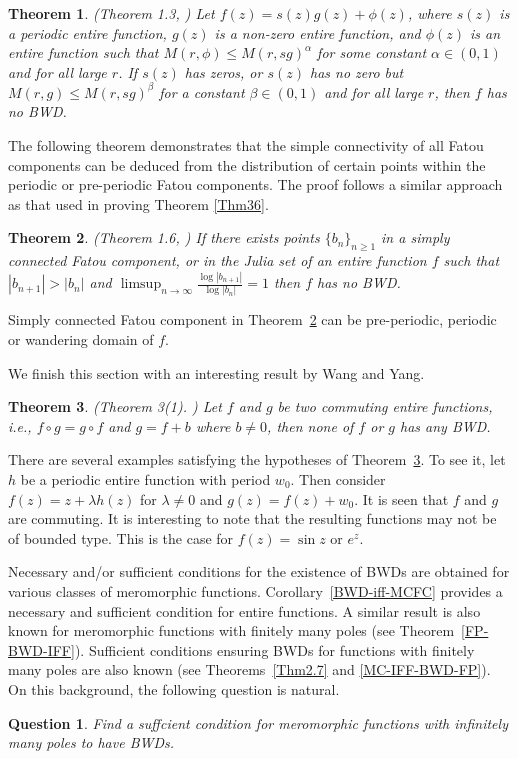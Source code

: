 \documentclass[11pt,a4paper]{article}
\newtheorem{theorem}{Theorem}[section]
\newtheorem{Question}{Question}
\begin{document}
	\begin{theorem}(Theorem 1.3, \cite{CaoWangZhao 2024})
		Let $f(z)=s(z)g(z)+\phi(z)$, where $s(z)$ is a periodic entire function, $g(z)$ is a non-zero entire function, and $\phi(z)$ is an entire function such that $M(r,\phi)\leq M(r, sg)^\alpha$ for some constant $\alpha\in(0,1)$ and for all large $r$. If $s(z)$ has zeros, or $s(z)$ has no zero  but $M(r, g)\leq M(r, sg)^\beta$ for a constant $\beta\in(0,1)$ and for all large $r$, then $f$ has no BWD.
\end{theorem}
	The following theorem demonstrates that the simple connectivity of all Fatou components can be deduced from the distribution of certain points within the periodic or pre-periodic Fatou components. The proof follows a similar approach as that used in proving Theorem \ref{Thm36}.
	\begin{theorem}(Theorem 1.6, \cite{CaoWangZhao 2024})
	If there exists points $\{b_n\}_{n\geq 1}$	in a simply connected Fatou component, or in the Julia set of an entire function $f$ such that $|b_{n+1}|>|b_n|$ and $\limsup_{n\to\infty}\frac{\log|b_{n+1}|}{\log|b_n|}=1$ then $f$ has no BWD.
		\label{CWZ2024}
	\end{theorem}
Simply connected Fatou component in Theorem~\ref{CWZ2024} can be pre-periodic, periodic or wandering domain  of $f$.
	\par We finish this section with an interesting result by Wang and Yang.
	\begin{theorem}(Theorem 3(1). \cite{WangYang 2003})
		Let $f$ and $g$ be two commuting entire functions, i.e.,  $f\circ g=g\circ f$ and $g=f+b$ where $b\neq 0$, then none of $f$ or $g$   has any BWD.
		\label{permutable-BWD}
	\end{theorem}
	There are several examples satisfying the hypotheses of Theorem~\ref{permutable-BWD}. To see it, let $h$ be a periodic entire function with period $w_0$. Then consider $f(z)= z+\lambda h(z)$ for $\lambda \neq 0$ and $g(z)= f(z)+w_0$.
	It is seen that $f$ and $g$ are commuting. It is interesting to note that the  resulting functions may not be of bounded type. This is the case for $f(z)=\sin z$ or $e^z$. 
\par
Necessary and/or sufficient conditions for the existence of BWDs are obtained for various classes of meromorphic functions. 
Corollary~\ref{BWD-iff-MCFC} provides a necessary and sufficient condition for entire functions. A similar result is also known for meromorphic functions with finitely many poles (see Theorem~\ref{FP-BWD-IFF}). Sufficient conditions ensuring BWDs for functions with finitely many poles are also known (see Theorems~\ref{Thm2.7} and \ref{MC-IFF-BWD-FP}). On this background, the following question is natural.
\begin{Question}
Find a suffcient condition for meromorphic functions with infinitely many poles to have BWDs. 
	\end{Question}
\end{document}
